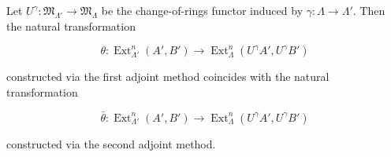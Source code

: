 Let $U^\gamma : \mathfrak{M}_{\Lambda'} \rightarrow \mathfrak{M}_\Lambda$ be the change-of-rings functor induced by $\gamma : \Lambda \rightarrow \Lambda'$. Then the natural transformation

$$\theta : \operatorname{Ext}_{\Lambda'}^n(A', B') \rightarrow \operatorname{Ext}_\Lambda^n(U^\gamma A', U^\gamma B')$$

constructed via the first adjoint method coincides with the natural transformation

$$\bar{\theta} : \operatorname{Ext}_{\Lambda'}^n(A', B') \rightarrow \operatorname{Ext}_\Lambda^n(U^\gamma A', U^\gamma B')$$

constructed via the second adjoint method.
